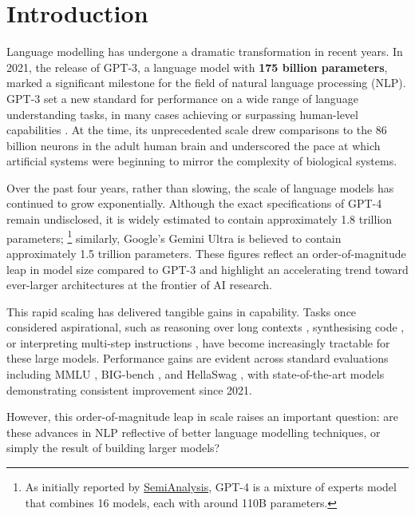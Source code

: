 \chapter{Introduction}

Language modelling has undergone a dramatic transformation in recent years. In 2021, the release of GPT-3, a language model with \textbf{175 billion parameters}, marked a significant milestone for the field of natural language processing (NLP). GPT-3 set a new standard for performance on a wide range of language understanding tasks, in many cases achieving or surpassing human-level capabilities \citep{brown2020gpt3}. At the time, its unprecedented scale drew comparisons to the 86 billion neurons in the adult human brain \citep{azevedo2009neurons} and underscored the pace at which artificial systems were beginning to mirror the complexity of biological systems.

Over the past four years, rather than slowing, the scale of language models has continued to grow exponentially. Although the exact specifications of GPT-4 remain undisclosed, it is widely estimated to contain approximately 1.8 trillion parameters; \footnote{As initially reported by \href{https://semianalysis.com/2023/07/10/gpt-4-architecture-infrastructure/}{SemiAnalysis}, GPT-4 is a mixture of experts model that combines 16 models, each with around 110B parameters.} similarly, Google's Gemini Ultra is believed to contain approximately 1.5 trillion parameters. These figures reflect an order-of-magnitude leap in model size compared to GPT-3 and highlight an accelerating trend toward ever-larger architectures at the frontier of AI research.

This rapid scaling has delivered tangible gains in capability. Tasks once considered aspirational, such as reasoning over long contexts \citep{lewis2020retrieval}, synthesising code \citep{chen2021evaluating}, or interpreting multi-step instructions \citep{wei2022chain}, have become increasingly tractable for these large models. Performance gains are evident across standard evaluations including MMLU \citep{hendrycks2021mmlu}, BIG-bench \citep{srivastava2023bigbench}, and HellaSwag \citep{zellers2019hellaswag}, with state-of-the-art models demonstrating consistent improvement since 2021.

However, this order-of-magnitude leap in scale raises an important question: are these advances in NLP reflective of better language modelling techniques, or simply the result of building larger models? 

